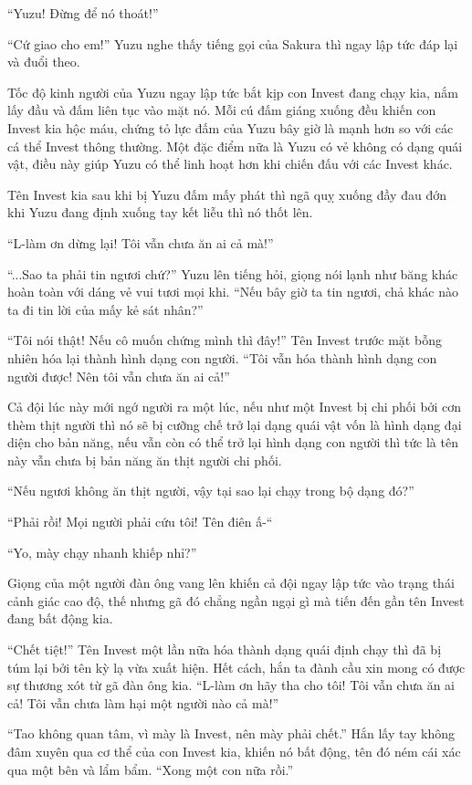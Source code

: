{``Yuzu! Đừng để nó thoát!''

``Cứ giao cho em!'' Yuzu nghe thấy tiếng gọi của Sakura thì ngay lập tức
đáp lại và đuổi theo.

Tốc độ kinh người của Yuzu ngay lập tức bắt kịp con Invest đang chạy
kia, nắm lấy đầu và đấm liên tục vào mặt nó. Mỗi cú đấm giáng xuống đều
khiến con Invest kia hộc máu, chứng tỏ lực đấm của Yuzu bây giờ là mạnh
hơn so với các cá thể Invest thông thường. Một đặc điểm nữa là Yuzu có
vẻ không có dạng quái vật, điều này giúp Yuzu có thể linh hoạt hơn khi
chiến đấu với các Invest khác.

Tên Invest kia sau khi bị Yuzu đấm mấy phát thì ngã quỵ xuống đầy đau
đớn khi Yuzu đang định xuống tay kết liễu thì nó thốt lên.

``L-làm ơn dừng lại! Tôi vẫn chưa ăn ai cả mà!''

``...Sao ta phải tin ngươi chứ?'' Yuzu lên tiếng hỏi, giọng nói lạnh như
băng khác hoàn toàn với dáng vẻ vui tươi mọi khi. ``Nếu bây giờ ta tin
ngươi, chả khác nào ta đi tin lời của mấy kẻ sát nhân?''

``Tôi nói thật! Nếu cô muốn chứng mình thì đây!'' Tên Invest trước mặt
bỗng nhiên hóa lại thành hình dạng con người. ``Tôi vẫn hóa thành hình
dạng con người được! Nên tôi vẫn chưa ăn ai cả!''

Cả đội lúc này mới ngớ người ra một lúc, nếu như một Invest bị chi phối
bởi cơn thèm thịt người thì nó sẽ bị cưỡng chế trở lại dạng quái vật vốn
là hình dạng đại diện cho bản năng, nếu vẫn còn có thể trở lại hình dạng
con người thì tức là tên này vẫn chưa bị bản năng ăn thịt người chi
phối.

``Nếu ngươi không ăn thịt người, vậy tại sao lại chạy trong bộ dạng
đó?''

``Phải rồi! Mọi người phải cứu tôi! Tên điên ấ-``

``Yo, mày chạy nhanh khiếp nhỉ?''

Giọng của một người đàn ông vang lên khiến cả đội ngay lập tức vào trạng
thái cảnh giác cao độ, thế nhưng gã đó chẳng ngần ngại gì mà tiến đến
gần tên Invest đang bất động kia.

``Chết tiệt!'' Tên Invest một lần nữa hóa thành dạng quái định chạy thì
đã bị túm lại bởi tên kỳ lạ vừa xuất hiện. Hết cách, hắn ta đành cầu xin
mong có được sự thương xót từ gã đàn ông kia. ``L-làm ơn hãy tha cho
tôi! Tôi vẫn chưa ăn ai cả! Tôi vẫn chưa làm hại một người nào cả mà!''

``Tao không quan tâm, vì mày là Invest, nên mày phải chết.'' Hắn lấy tay
không đâm xuyên qua cơ thể của con Invest kia, khiến nó bất động, tên đó
ném cái xác qua một bên và lẩm bẩm. ``Xong một con nữa rồi.''

}
